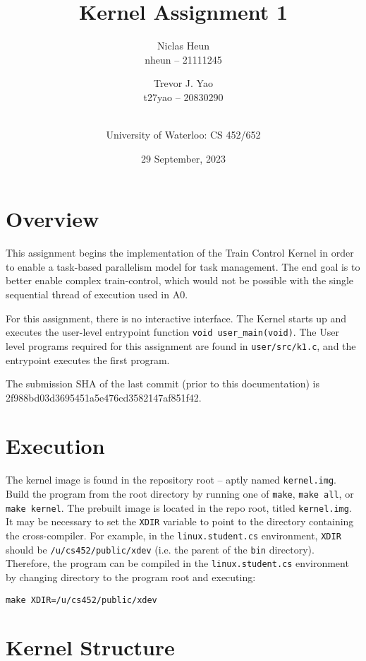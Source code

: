 \documentclass[12pt]{article}
\title{Kernel Assignment 1}
\author{Niclas Heun \\ nheun -- 21111245 \and Trevor J. Yao \\ t27yao -- 20830290 \and \\ University of Waterloo: CS 452/652}
\date{29 September, 2023}
\begin{document}
    \maketitle
    \pagestyle{fancy}
    
    \section{Overview}
    \label{sec:overview}
    
    This assignment begins the implementation of the Train Control Kernel in order to enable a task-based parallelism model for task management. The end goal is to better enable complex train-control, which would not be possible with the single sequential thread of execution used in A0.
    
    For this assignment, there is no interactive interface. The Kernel starts up and executes the user-level entrypoint function \verb`void user_main(void)`. The User level programs required for this assignment are found in \verb`user/src/k1.c`, and the entrypoint executes the first program.
    
    The submission SHA of the last commit (prior to this documentation) is  \\ 2f988bd03d3695451a5e476cd3582147af851f42.
    
    \section{Execution}
    
    The kernel image is found in the repository root -- aptly named \verb`kernel.img`. Build the program from the root directory by running one of \verb`make`, \verb`make all`, or \verb`make kernel`. The prebuilt image is located in the repo root, titled \verb`kernel.img`. It may be necessary to set the \verb`XDIR` variable to point to the directory containing the cross-compiler. For example, in the \verb`linux.student.cs` environment, \verb`XDIR` should be \verb`/u/cs452/public/xdev` (i.e. the parent of the \verb`bin` directory). Therefore, the program can be compiled in the \verb`linux.student.cs` environment by changing directory to the program root and executing:
    \begin{verbatim}
make XDIR=/u/cs452/public/xdev
    \end{verbatim}
    
    \section{Kernel Structure}
    
\end{document}
